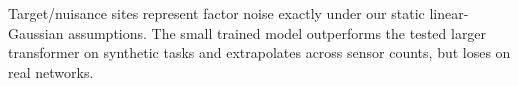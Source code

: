 Target/nuisance sites represent factor noise exactly under our static linear-Gaussian assumptions. The small
trained model outperforms the tested larger transformer on synthetic tasks and extrapolates across sensor counts,
but loses on real networks. 
